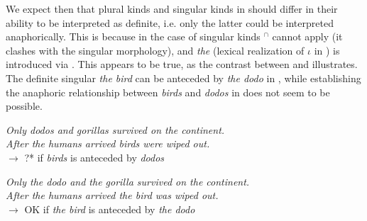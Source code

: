 \documentclass[output=paper,
modfonts
]{langscibook}
\begin{document}
	We expect then that plural kinds and singular kinds in  should differ in their ability to be interpreted as definite, i.e. only the latter could be interpreted anaphorically.
	This is because in the case of singular kinds $^\cap$ cannot apply (it clashes with the singular  morphology), and \textit{the} (lexical realization of $\iota$ in ) is introduced via .
	This appears to be true, as the contrast between  and  illustrates. The definite singular \textit{the bird} can be anteceded by \textit{the dodo} in , while establishing the anaphoric relationship between  \textit{birds} and \textit{dodos} in  does not seem to be possible.
	
	\ea \label{ex:despic:44} 
	\textit{Only dodos and gorillas survived on the continent.} \\
	\textit{After the humans arrived birds were wiped out.} \\
	$\rightarrow$ ?* if \textit{birds} is anteceded by \textit{dodos}
	\z 
	
	\ea \label{ex:despic:45}
	\textit{Only the dodo and the gorilla survived on the continent.} \\
	\textit{After the humans arrived the bird was wiped out.} \\
	$\rightarrow$ OK if \textit{the bird} is anteceded by \textit{the dodo}
	\z 
	
\end{document}
